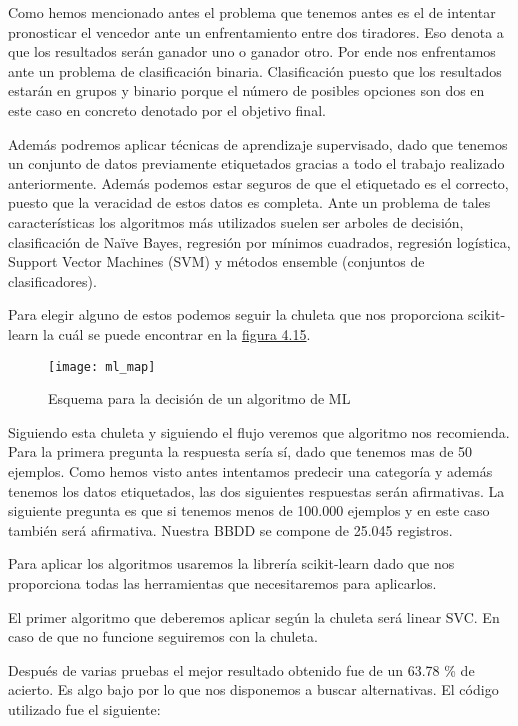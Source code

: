 Como hemos mencionado antes el problema que tenemos antes es el de intentar pronosticar
el vencedor ante un enfrentamiento entre dos tiradores. Eso denota a que los resultados
serán ganador uno o ganador otro. Por ende nos enfrentamos ante un problema de clasificación
binaria. Clasificación puesto que los resultados estarán en grupos y binario porque el número
de posibles opciones son dos en este caso en concreto denotado por el objetivo final.

Además podremos aplicar técnicas de aprendizaje supervisado, dado que tenemos un conjunto de datos
previamente etiquetados gracias a todo el trabajo realizado anteriormente. Además podemos
estar seguros de que el etiquetado es el correcto, puesto que la veracidad de estos datos
es completa. Ante un problema de tales características los algoritmos más utilizados suelen ser
arboles de decisión, clasificación de Naïve Bayes, regresión por mínimos cuadrados, regresión
logística, Support Vector Machines (SVM) y métodos ensemble (conjuntos de clasificadores).

Para elegir alguno de estos podemos seguir la chuleta\cite{scikitCheatSheet} que nos proporciona scikit-learn la cuál se
puede encontrar en la \hyperref[fig:Chuleta decisión algoritmo ML]{figura 4.15}.

\begin{figure}[htb]
  \centering
    \texttt{[image: ml\_map]}
  \caption[Esquema para la decisión de un algoritmo de ML]{Esquema para la decisión de un algoritmo de ML}
  \label{fig:Chuleta decisión algoritmo ML}
\end{figure}

Siguiendo esta chuleta y siguiendo el flujo veremos que algoritmo nos recomienda.
Para la primera pregunta la respuesta sería sí, dado que tenemos mas de 50 ejemplos.
Como hemos visto antes intentamos predecir una categoría y además tenemos los datos
etiquetados, las dos siguientes respuestas serán afirmativas. La siguiente pregunta
es que si tenemos menos de 100.000 ejemplos y en este caso también será afirmativa.
Nuestra \acs{BBDD} se compone de 25.045 registros.

Para aplicar los algoritmos usaremos la librería scikit-learn dado que nos proporciona
todas las herramientas que necesitaremos para aplicarlos.

El primer algoritmo que deberemos aplicar según la chuleta será linear SVC. En caso
de que no funcione seguiremos con la chuleta.

Después de varias pruebas el mejor resultado obtenido fue de un 63.78 \% de acierto. Es
algo bajo por lo que nos disponemos a buscar alternativas. El código utilizado fue el siguiente:

